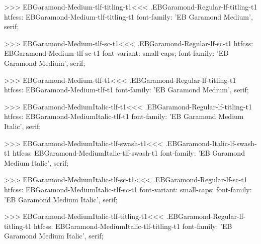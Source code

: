 {{{{{{{>>>
\<EBGaramond-Medium-tlf-titling-t1\><<<
.EBGaramond-Regular-lf-titling-t1
htfcss:  EBGaramond-Medium-tlf-titling-t1  font-family: 'EB Garamond Medium', serif;

>>>
\<EBGaramond-Medium-tlf-sc-t1\><<<
.EBGaramond-Regular-lf-sc-t1
htfcss:  EBGaramond-Medium-tlf-sc-t1  font-variant: small-caps; font-family: 'EB Garamond Medium', serif;

>>>
\<EBGaramond-Medium-tlf-t1\><<<
.EBGaramond-Regular-lf-titling-t1
htfcss:  EBGaramond-Medium-tlf-t1  font-family: 'EB Garamond Medium', serif;

>>>
\<EBGaramond-MediumItalic-tlf-t1\><<<
.EBGaramond-Regular-lf-titling-t1
htfcss:  EBGaramond-MediumItalic-tlf-t1  font-family: 'EB Garamond Medium Italic', serif;

>>>
\<EBGaramond-MediumItalic-tlf-swash-t1\><<<
.EBGaramond-Italic-lf-swash-t1
htfcss:  EBGaramond-MediumItalic-tlf-swash-t1  font-family: 'EB Garamond Medium Italic', serif;

>>>
\<EBGaramond-MediumItalic-tlf-sc-t1\><<<
.EBGaramond-Regular-lf-sc-t1
htfcss:  EBGaramond-MediumItalic-tlf-sc-t1  font-variant: small-caps; font-family: 'EB Garamond Medium Italic', serif;

>>>
\<EBGaramond-MediumItalic-tlf-titling-t1\><<<
.EBGaramond-Regular-lf-titling-t1
htfcss:  EBGaramond-MediumItalic-tlf-titling-t1  font-family: 'EB Garamond Medium Italic', serif;

}}}}}}}
